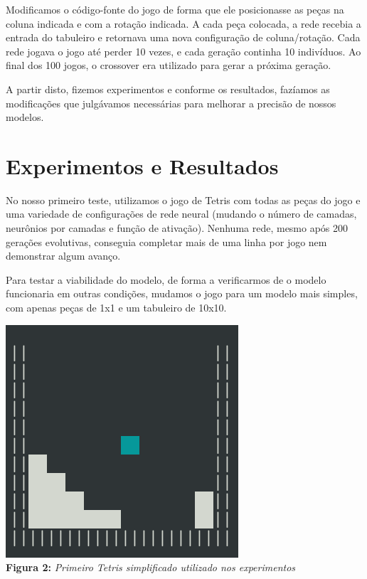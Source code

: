 \documentclass[conference]{IEEEtran}
\begin{document}
Modificamos o código-fonte do jogo de forma que ele posicionasse as peças na coluna indicada e com a rotação indicada. A cada peça colocada, a rede recebia a entrada do tabuleiro e retornava uma nova configuração de coluna/rotação. Cada rede jogava o jogo até perder 10 vezes, e cada geração continha 10 indivíduos. Ao final dos 100 jogos, o crossover era utilizado para gerar a próxima geração.

A partir disto, fizemos experimentos e conforme os resultados, fazíamos as modificações que julgávamos necessárias para melhorar a precisão de nossos modelos.

\section{Experimentos e Resultados}
No nosso primeiro teste, utilizamos o jogo de Tetris com todas as peças do jogo e uma variedade de configurações de rede neural (mudando o número de camadas, neurônios por camadas e função de ativação). Nenhuma rede, mesmo após 200 gerações evolutivas, conseguia completar mais de uma linha por jogo nem demonstrar algum avanço. 

Para testar a viabilidade do modelo, de forma a verificarmos de o modelo funcionaria em outras condições, mudamos o jogo para um modelo mais simples, com apenas peças de 1x1 e um tabuleiro de 10x10.

\begin{center}
\includegraphics[scale=0.3]{tetris_simples.png}\\

\textbf{Figura 2:} \textit{Primeiro Tetris simplificado utilizado nos experimentos}
\end{center}
\end{document}
